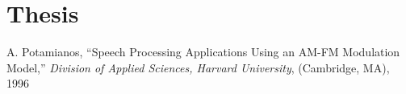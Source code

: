 \newpage

\section*{Thesis}

A. Potamianos, ``Speech Processing Applications Using an AM-FM Modulation Model,'' 
{\em Division of Applied Sciences, Harvard University}, (Cambridge, MA), 1996


